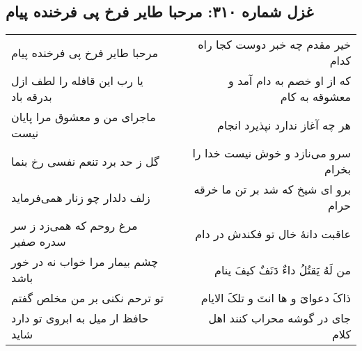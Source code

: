 \begin{center}
\section*{غزل شماره ۳۱۰: مرحبا طایر فرخ پی فرخنده پیام}
\label{sec:sh310}
\begin{longtable}{l p{0.5cm} r}
مرحبا طایر فرخ پی فرخنده پیام
&&
خیر مقدم چه خبر دوست کجا راه کدام
\\
یا رب این قافله را لطف ازل بدرقه باد
&&
که از او خصم به دام آمد و معشوقه به کام
\\
ماجرای من و معشوق مرا پایان نیست
&&
هر چه آغاز ندارد نپذیرد انجام
\\
گل ز حد برد تنعم نفسی رخ بنما
&&
سرو می‌نازد و خوش نیست خدا را بخرام
\\
زلف دلدار چو زنار همی‌فرماید
&&
برو ای شیخ که شد بر تن ما خرقه حرام
\\
مرغ روحم که همی‌زد ز سر سدره صفیر
&&
عاقبت دانهٔ خال تو فکندش در دام
\\
چشم بیمار مرا خواب نه در خور باشد
&&
من لَهُ یَقتُلُ داءٌ دَنَفٌ کیفَ ینام
\\
تو ترحم نکنی بر من مخلص گفتم
&&
ذاکَ دعوایَ و ها انتَ و تلکَ الایام
\\
حافظ ار میل به ابروی تو دارد شاید
&&
جای در گوشه محراب کنند اهل کلام
\\
\end{longtable}
\end{center}

